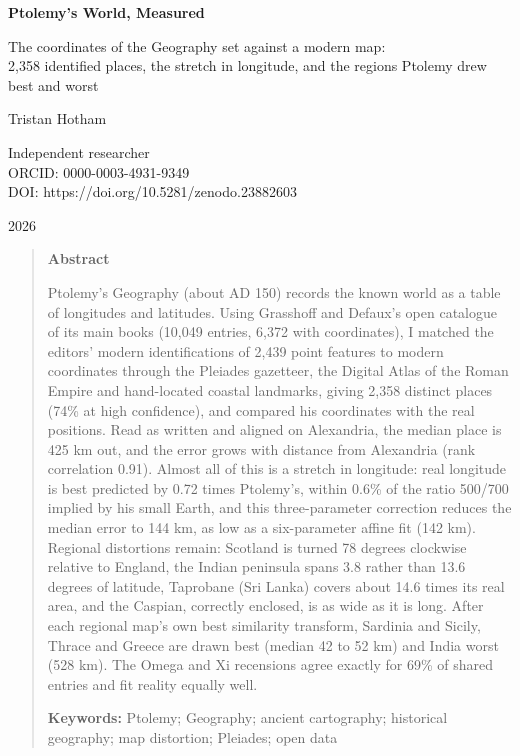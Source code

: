 \documentclass[11pt,a4paper]{article}
\begin{document}
\begin{center}
{\Large\bfseries Ptolemy's World, Measured\par}
\vspace{0.4em}
{\large The coordinates of the Geography set against a modern map:\\2,358 identified places, the stretch in longitude, and the regions Ptolemy drew best and worst\par}
\vspace{1.2em}
{\large Tristan Hotham\par}
\vspace{0.3em}
{\small Independent researcher\\
ORCID: 0000-0003-4931-9349\\
DOI: https://doi.org/10.5281/zenodo.23882603\par}
\vspace{0.8em}
2026
\end{center}

\begin{quote}
\small
\begin{center}\textbf{Abstract}\end{center}
Ptolemy's Geography (about AD 150) records the known world as a table of longitudes and latitudes. Using Grasshoff and Defaux's open catalogue of its main books (10,049 entries, 6,372 with coordinates), I matched the editors' modern identifications of 2,439 point features to modern coordinates through the Pleiades gazetteer, the Digital Atlas of the Roman Empire and hand-located coastal landmarks, giving 2,358 distinct places (74\% at high confidence), and compared his coordinates with the real positions. Read as written and aligned on Alexandria, the median place is 425 km out, and the error grows with distance from Alexandria (rank correlation 0.91). Almost all of this is a stretch in longitude: real longitude is best predicted by 0.72 times Ptolemy's, within 0.6\% of the ratio 500/700 implied by his small Earth, and this three-parameter correction reduces the median error to 144 km, as low as a six-parameter affine fit (142 km). Regional distortions remain: Scotland is turned 78 degrees clockwise relative to England, the Indian peninsula spans 3.8 rather than 13.6 degrees of latitude, Taprobane (Sri Lanka) covers about 14.6 times its real area, and the Caspian, correctly enclosed, is as wide as it is long. After each regional map's own best similarity transform, Sardinia and Sicily, Thrace and Greece are drawn best (median 42 to 52 km) and India worst (528 km). The Omega and Xi recensions agree exactly for 69\% of shared entries and fit reality equally well.

\textbf{Keywords:} Ptolemy; Geography; ancient cartography; historical geography; map distortion; Pleiades; open data
\end{quote}
\end{document}
